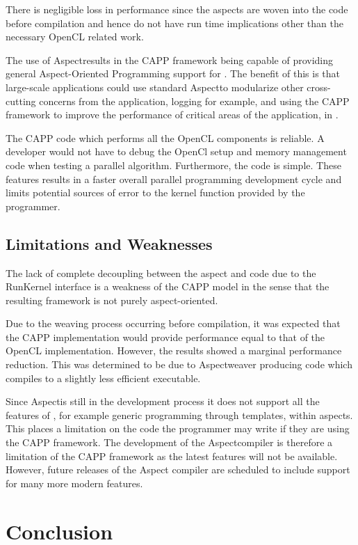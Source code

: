 \documentclass{sig-alternate-05-2015}
\begin{document}
There is negligible loss in performance since the aspects are woven into the
\CPP code before compilation and hence do not have run time implications other
than the necessary OpenCL related work.

The use of Aspect\CPP results in the  CAPP framework being capable of
providing general Aspect-Oriented Programming support for \CPP. The benefit of this is that
large-scale applications could use standard Aspect\CPP to modularize other
cross-cutting concerns from the \CPP application, logging for example, and using the
 CAPP framework to improve the performance of critical areas of the
application, in \CPP.

The CAPP code which performs all the OpenCL components is reliable.
A developer would not have to debug the OpenCl setup and memory management code
when testing a parallel algorithm. Furthermore, the \CPP code is simple. These
features results in a faster overall parallel programming development cycle and
limits potential sources of error to the kernel function provided by the
programmer.

\subsection{Limitations and Weaknesses}

The lack of complete decoupling between the aspect and \CPP code due to the RunKernel interface is a weakness
of the CAPP model in the sense that the resulting framework is not purely aspect-oriented.

Due to the weaving process occurring before compilation, it was expected that
the CAPP implementation would provide performance equal to that of the
OpenCL implementation. However, the results showed a marginal performance
reduction. This was determined to be due to Aspect\CPP weaver producing code
which compiles to a slightly less efficient executable. 

Since Aspect\CPP is still in the development process it does not support all 
the features of \CPP, for example generic programming through templates, within
aspects. 
This places a limitation on the \CPP code  the programmer may write if they 
are using the  CAPP framework. The development of the Aspect\CPP compiler 
is therefore a limitation of the  CAPP framework as the latest \CPP 
features will not be available. However, future releases of the Aspect\CPP
compiler are scheduled to include support for many more modern \CPP features.

\section{Conclusion}\label{sec:conclusion}
\end{document}
